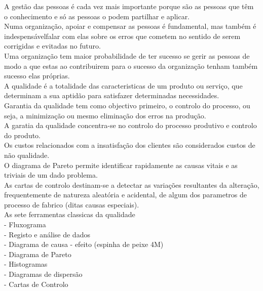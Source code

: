 A gestão das pessoas é cada vez mais importante porque são as pessoas que têm o conhecimento e só as pessoas o podem partilhar e aplicar.\\

Numa organização, apoiar e compensar as pessoas é fundamental, mas também é indespensávelfalar com elas sobre os erros que cometem no sentido de serem corrigidas e evitadas no futuro.\\

Uma organização tem maior probabilidade de ter sucesso se gerir as pessoas de modo a que estas ao contribuirem para o sucesso da organização tenham também sucesso elas próprias.\\

A qualidade é a totalidade das caracteristicas de um produto ou serviço, que determinam a sua aptidão para satisfazer determinadas necessidades.\\

Garantia da qualidade tem como objectivo primeiro, o controlo do processo, ou seja, a minimização ou mesmo eliminação dos erros na produção.\\

A garatia da qualidade concentra-se no controlo do processo produtivo e controlo do produto.\\

Os custos relacionados com a insatisfação dos clientes são considerados custos de não qualidade.\\

O diagrama de Pareto permite identificar rapidamente as causas vitais e as triviais de um dado problema.\\

As cartas de controlo destinam-se a detectar as variações resultantes da alteração, frequentemente de natureza aleatória e acidental, de algum dos parametros de processo de fabrico (ditas causas especiais).\\

As sete ferramentas classicas da qualidade\\
- Fluxograma\\
- Registo e análise de dados\\
- Diagrama de causa - efeito (espinha de peixe 4M)\\
- Diagrama de Pareto\\
- Histogramas\\
- Diagramas de dispersão\\
- Cartas de Controlo\\

